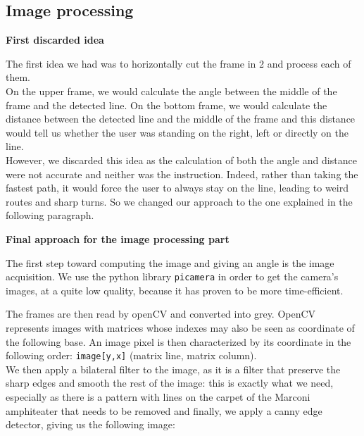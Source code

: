 \documentclass{rapport}
\begin{document}
\subsection{Image processing}
\vspace{3mm}
\begin{flushleft}
    \textbf{\large{First discarded idea}}
\end{flushleft}
The first idea we had was to horizontally cut the frame in 2 and process each of them.\\On the upper frame, we would calculate the angle between the middle of the frame and the detected line. On the bottom frame, we would calculate the distance between the detected line and the middle of the frame and this distance would tell us whether the user was standing on the right, left or directly on the line.\\ However, we discarded this idea as the calculation of both the angle and distance were not accurate and neither was the instruction. Indeed, rather than taking the fastest path, it would force the user to always stay on the line, leading to weird routes and sharp turns.
So we changed our approach to the one explained in the following paragraph.
\begin{flushleft}
    \textbf{\large{Final approach for the image processing part}}
\end{flushleft}
The first step toward computing the image and giving an angle is the image acquisition. We use the python library \verb|picamera| in order to get the camera's images, at a quite low quality, because it has proven to be more time-efficient.\\
\begin{center}
\end{center}
The frames are then read by openCV and converted into grey. OpenCV represents images with matrices whose indexes may also be seen as coordinate of the following base. An image pixel is then characterized by its coordinate in the following order: \verb|image[y,x]| (matrix line, matrix column).\\We then apply a bilateral filter to the image, as it is a filter that preserve the sharp edges and smooth the rest of the image: this is exactly what we need, especially as there is a pattern with lines on the carpet of the Marconi amphiteater that needs to be removed and finally, we apply a canny edge detector, giving us the following image:\\
\end{document}

